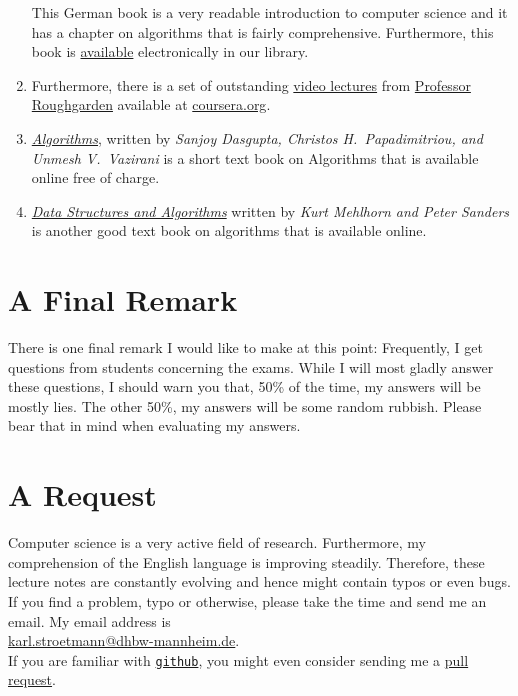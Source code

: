 \begin{enumerate}
      This German book is a very readable introduction to computer science and it has a chapter
      on algorithms that is fairly comprehensive.  Furthermore, this book is
      \href{http://www.oldenbourg-link.com/doi/book/10.1524/9783486595390}{available} electronically
      in our library. 
\item Furthermore, there is a set of outstanding 
      \href{https://class.coursera.org/algo-004/class/index}{video lectures} 
      from \href{http://theory.stanford.edu/~tim/}{Professor Roughgarden}
      available at \href{https://www.coursera.org/}{coursera.org}.
\item \href{http://beust.com/algorithms.pdf}{\emph{Algorithms}},
      written by \textsl{Sanjoy Dasgupta, Christos H.~Papadimitriou, and Unmesh V.~Vazirani} \cite{dasgupta:2008}
      is a short text book on Algorithms that is available online free of charge.
\item \href{http://www.mpi-inf.mpg.de/~mehlhorn/Toolbox.html}{\emph{Data Structures and Algorithms}}
      written by \emph{Kurt Mehlhorn and Peter Sanders} \cite{mehlhorn:2008} is another good text
      book on algorithms that is available online.
\end{enumerate}


\section{A Final Remark}
There is one final remark I would like to make at this point:  Frequently, I get questions from
students concerning the exams.  While I will most gladly answer these questions, I should warn you
that, 50\%  
of the time, my answers will be mostly lies.  The other 50\%,
my answers will be some random rubbish.  Please bear that in mind when evaluating my answers.

\section{A Request}
Computer science is a very active field of research.  Furthermore, my comprehension of the English
language is improving steadily.  Therefore, these lecture notes are constantly
evolving and hence might contain typos or even bugs.  If you find a problem, typo or otherwise,
please take the time and send me an email.  My email address is
\\[0.2cm]
\hspace*{1.3cm}
\href{mailto:karl.stroetmann@dhbw-mannheim.de}{karl.stroetmann@dhbw-mannheim.de}.
\\[0.2cm]
If you are familiar with \href{http://github.com}{\texttt{github}}, you might even consider
sending me a \href{https://help.github.com/articles/using-pull-requests}{pull request}.

